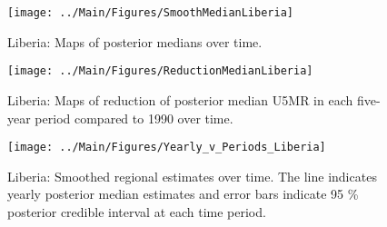 \documentclass[12pt]{article}\usepackage[]{graphicx}\usepackage[]{color}
\newenvironment{knitrout}{}{} %
\begin{document}
\begin{knitrout}
\color{fgcolor}\begin{figure}[bht]

{\centering \texttt{[image: ../Main/Figures/SmoothMedianLiberia]} 

}

\caption[Liberia]{Liberia: Maps of posterior medians over time.}\label{fig:unnamed-chunk-184}
\end{figure}


\end{knitrout}
\begin{knitrout}
\color{fgcolor}\begin{figure}[bht]

{\centering \texttt{[image: ../Main/Figures/ReductionMedianLiberia]} 

}

\caption[Liberia]{Liberia: Maps of reduction of posterior median U5MR in each five-year period compared to 1990 over time.}\label{fig:unnamed-chunk-185}
\end{figure}


\end{knitrout}
\begin{knitrout}
\color{fgcolor}\begin{figure}[bht]

{\centering \texttt{[image: ../Main/Figures/Yearly\_v\_Periods\_Liberia]} 

}

\caption[Liberia]{Liberia: Smoothed regional estimates over time. The line indicates yearly posterior median estimates and error bars indicate 95 \% posterior credible interval at each time period.}\label{fig:unnamed-chunk-186}
\end{figure}


\end{knitrout}
\end{document}
